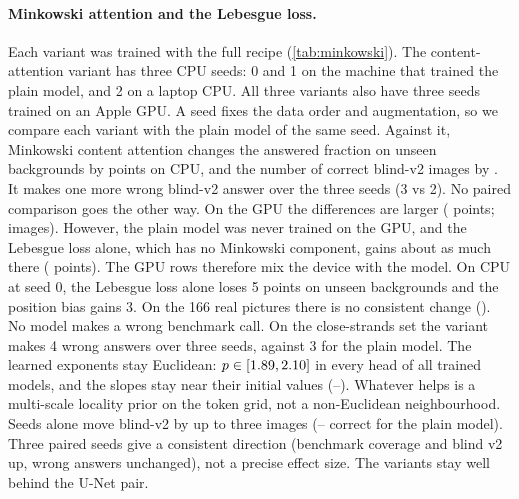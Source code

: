 \begin{table}[t]
\centering\footnotesize
\setlength{\tabcolsep}{\widetabcolsep}
\caption{\textbf{Minkowski attention, the Lebesgue loss and gap evidence.} Mean$\pm$sd over seeds;
wrong answers are summed over seeds. Variants are added cumulatively (\cref{sec:method}). A seed
fixes the data order and augmentation, so each variant has a plain counterpart with the same seed
(see text). $^\dagger$Blind v1 is no longer blind for the gap evidence, whose design followed its
errors. Blind v2 is (\cref{tab:blind2}).}
\label{tab:minkowski}
\end{table}

\paragraph{Minkowski attention and the Lebesgue loss.} Each variant was trained with the full recipe
(\cref{tab:minkowski}). The content-attention variant has three CPU seeds: 0 and 1 on the machine that
trained the plain model, and 2 on a laptop CPU. All three variants also have three seeds trained on
an Apple GPU. A seed fixes the data order and augmentation, so we compare each variant with the
plain model of the same seed. Against it, Minkowski content attention changes the answered fraction
on unseen backgrounds by \MkCpuUnseenDiffs{} points on CPU, and the number of correct blind-v2
images by \MkCpuVtwoDiffs{}. It makes one more wrong blind-v2 answer over the three seeds (3 vs 2).
No paired comparison goes the other way. On the GPU the
differences are larger (\MkMpsUnseenDiffs{} points; \MkMpsVtwoDiffs{} images). However, the plain
model was never trained on the GPU, and the Lebesgue loss alone, which has no Minkowski component,
gains about as much there (\LebMpsUnseenDiffs{} points). The GPU rows therefore mix the device with the
model. On CPU at seed 0, the Lebesgue loss alone loses 5 points on unseen backgrounds and the
position bias gains 3. On the 166 real pictures there is no consistent change (\MkCpuRealDiffs{}).
No model makes a wrong benchmark call. On the close-strands set the variant makes 4 wrong answers over
three seeds, against 3 for the plain model. The learned exponents
stay Euclidean: $p\in[1.89,2.10]$ in every head of all \LearnedModels{} trained
models, and the slopes stay near their initial values (\LearnedAlphaMin--\LearnedAlphaMax). Whatever
helps is a multi-scale locality prior on the token grid, not a non-Euclidean neighbourhood. Seeds
alone move blind-v2 by up to three images (\PlainVtwoMin--\PlainVtwoMax{} correct for the plain
model). Three paired seeds give a consistent direction (benchmark coverage and blind v2 up, wrong
answers unchanged), not a precise effect size. The variants stay well behind the U-Net pair.

